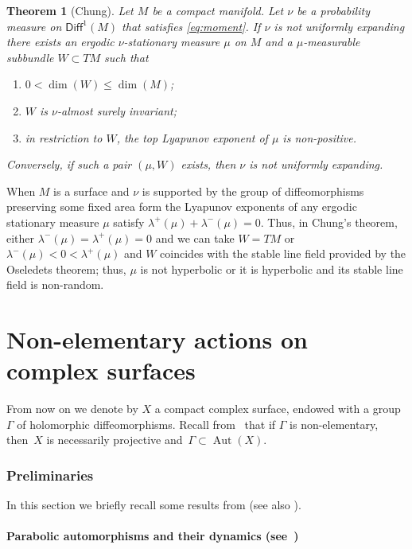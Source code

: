 \documentclass[11pt]{article}
\newenvironment{enumeratea}
{\bgroup\def\theenumi{\alph{enumi}}\begin{enumerate}}
{\end{enumerate}\egroup}
\DeclareMathOperator{\aut}{Aut}
\newcommand\Diff{{\mathsf{Diff}}}
\theoremstyle{plain}
\newtheorem{thm}{Theorem}[section]
\theoremstyle{definition}
\numberwithin{equation}{section}
\begin{document}
\begin{thm}[Chung] \label{thm:criterion_chung}
Let $M$ be a compact manifold. Let $\nu$ be a probability measure on $\Diff^1(M)$
that satisfies \eqref{eq:moment}. If $\nu$ is not uniformly expanding there exists an ergodic $\nu$-stationary measure $\mu$ on $M$ and a $\mu$-measurable
subbundle $W\subset TM$ such that
\begin{enumeratea}
\item\label{thm:criterion_chunga} $0<\dim(W)\leq \dim(M)$;
\item\label{thm:criterion_chungb} $W$ is $\nu$-almost surely invariant;
\item\label{thm:criterion_chungc} in restriction to $W$, the top Lyapunov exponent of $\mu$ is non-positive.
\end{enumeratea}
Conversely, if such a pair $(\mu, W)$ exists, then $\nu$ is not uniformly expanding.
\end{thm}

When $M$ is a surface and $\nu$ is supported by the group of diffeomorphisms preserving some fixed area form
the Lyapunov exponents of any ergodic stationary measure $\mu$ satisfy $\lambda^+(\mu)+\lambda^{-}(\mu)=0$. Thus,
in Chung's theorem, either $\lambda^{-}(\mu)=\lambda^{+}(\mu)=0$ and we can take $W=TM$ or $\lambda^{-}(\mu)<0<\lambda^+(\mu)$ and $W$ coincides with the stable line field
provided by the
Oseledets theorem; thus, $\mu$ is not hyperbolic or it is hyperbolic and its stable line field is non-random.\vspace*{-.5\baselineskip}

\part{Non-elementary actions on complex surfaces}

From now on we denote by $X$ a compact complex surface, endowed with a
group~$\Gamma$ of holomorphic
diffeomorphisms. Recall from~\cite{stiffness, Simons} that if $\Gamma$ is non-elementary, then~$X$ is necessarily projective and~$\Gamma\subset \aut(X)$.

\section{Preliminaries}\label{sec:preliminaries}

In this section we briefly recall some results from \cite{invariant} (see also \cite{cantat_groupes, Cantat:Milnor}).

\subsection{Parabolic automorphisms and their dynamics (see~\cite[\S 3]{invariant})} \label{subs:halphen}
\end{document}
